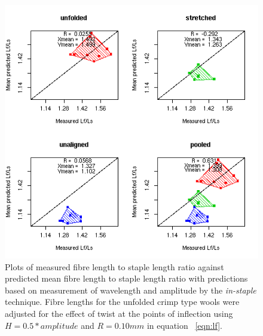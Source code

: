 %

\begin{figure}[!h]
  \centering
  \includegraphics[width=1.1\textwidth]{figispredlfr.png}
  \caption{Plots of measured fibre length to staple length ratio against predicted mean fibre length to staple length ratio with predictions based on measurement of wavelength and amplitude by the {\em in-staple} technique. Fibre lengths for the unfolded crimp type wools were adjusted for the effect of twist at the points of inflection using $H = 0.5 * amplitude$ and $R = 0.10 mm$ in equation ~\ref{eqn:lf}.}
  \label{fig:ispredlfr}
\end{figure}

%

